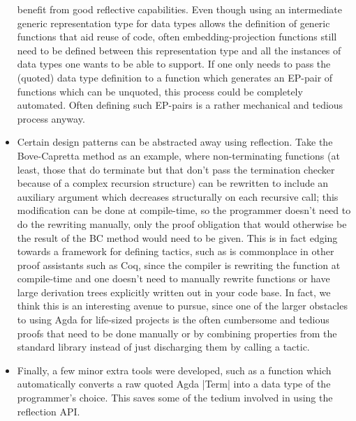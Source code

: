 \begin{itemize}
benefit from good reflective capabilities. Even though using an
intermediate generic representation type for data types allows the
definition of generic functions that aid reuse of code, often
embedding-projection functions still need to be defined between this
representation type and all the instances of data types one wants to be
able to support. If one only needs to pass the
(quoted) data type definition to a function which generates an EP-pair
of functions which can be unquoted, this process could be completely
automated. Often defining such EP-pairs is a rather mechanical and
tedious process anyway.
  \item Certain design patterns can be abstracted away using
reflection. Take the Bove-Capretta method as an example, where
non-terminating functions (at least, those that do terminate but that
don't pass the termination checker because of a complex recursion
structure) can be rewritten to include an auxiliary argument which
decreases structurally on each recursive call; this modification can be done at compile-time, so the programmer doesn't
need to do the rewriting manually, only the proof obligation that
would otherwise be
the result of the BC method would need to be given.  This is in fact
edging towards a framework for defining tactics, such as is
commonplace in other proof assistants such as Coq, since the
compiler is rewriting the function at compile-time and one doesn't
need to manually rewrite functions or have large derivation trees
explicitly written out in your code base.  In fact, we think this is
an interesting avenue to pursue, since one of the larger obstacles to
using Agda for life-sized projects is the often cumbersome and tedious
proofs that need to be done manually or by combining properties from
the standard library instead of just discharging them by calling a
tactic.
\item Finally, a few minor extra tools were developed, such as a function
    which automatically converts a raw quoted Agda |Term| into a data type
    of the programmer's choice. This saves some of the tedium involved in using
    the reflection API.
\end{itemize}




